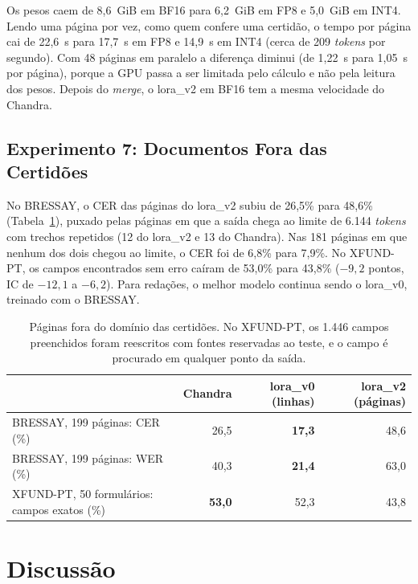 Os pesos caem de 8,6~GiB em BF16 para 6,2~GiB em FP8 e 5,0~GiB em INT4. Lendo uma página por vez, como quem confere uma certidão, o tempo por página cai de 22,6~s para 17,7~s em FP8 e 14,9~s em INT4 (cerca de 209 \emph{tokens} por segundo). Com 48 páginas em paralelo a diferença diminui (de 1,22~s para 1,05~s por página), porque a GPU passa a ser limitada pelo cálculo e não pela leitura dos pesos. Depois do \emph{merge}, o lora\_v2 em BF16 tem a mesma velocidade do Chandra.

\subsection{Experimento 7: Documentos Fora das Certidões}
\label{subsec:exp7}

No BRESSAY, o CER das páginas do lora\_v2 subiu de 26,5\% para 48,6\% (Tabela~\ref{tab:real}), puxado pelas páginas em que a saída chega ao limite de 6.144 \emph{tokens} com trechos repetidos (12 do lora\_v2 e 13 do Chandra). Nas 181 páginas em que nenhum dos dois chegou ao limite, o CER foi de 6,8\% para 7,9\%. No XFUND-PT, os campos encontrados sem erro caíram de 53,0\% para 43,8\% ($-9{,}2$ pontos, IC de $-12{,}1$ a $-6{,}2$). Para redações, o melhor modelo continua sendo o lora\_v0, treinado com o BRESSAY.

\begin{table}[H]
\centering
\small
\begin{tabular}{@{}lrrr@{}}
\toprule
& Chandra & lora\_v0 (linhas) & lora\_v2 (páginas) \\
\midrule
BRESSAY, 199 páginas: CER (\%) & 26,5 & \textbf{17,3} & 48,6 \\
BRESSAY, 199 páginas: WER (\%) & 40,3 & \textbf{21,4} & 63,0 \\
XFUND-PT, 50 formulários: campos exatos (\%) & \textbf{53,0} & 52,3 & 43,8 \\
\bottomrule
\end{tabular}
\caption{Páginas fora do domínio das certidões. No XFUND-PT, os 1.446 campos preenchidos foram reescritos com fontes reservadas ao teste, e o campo é procurado em qualquer ponto da saída.}
\label{tab:real}
\end{table}

\section{Discussão}
\label{sec:discussao}

